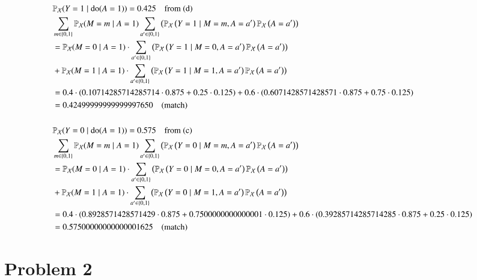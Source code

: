 \documentclass[10pt]{article}
\begin{document}
\begin{align*}
    &\mathbb{P}_{\mathcal{X}}(Y=1 \mid \operatorname{do}(A=1))=0.425 \quad \text{from (d)}\\
    &\sum_{m \in\{0,1\}} \mathbb{P}_{\mathcal{X}}(M=m \mid A=1) \sum_{a^{\prime} \in\{0,1\}}\left(\mathbb{P}_{\mathcal{X}}\left(Y=1 \mid M=m, A=a^{\prime}\right) \mathbb{P}_{\mathcal{X}}\left(A=a^{\prime}\right)\right)\\
    &= \mathbb{P}_{\mathcal{X}}(M=0 \mid A=1) \cdot \sum_{a^{\prime} \in\{0,1\}}\left(\mathbb{P}_{\mathcal{X}}\left(Y=1 \mid M=0, A=a^{\prime}\right) \mathbb{P}_{\mathcal{X}}\left(A=a^{\prime}\right)\right) \\ 
    &+ \mathbb{P}_{\mathcal{X}}(M=1 \mid A=1) \cdot \sum_{a^{\prime} \in\{0,1\}}\left(\mathbb{P}_{\mathcal{X}}\left(Y=1 \mid M=1, A=a^{\prime}\right) \mathbb{P}_{\mathcal{X}}\left(A=a^{\prime}\right)\right) \\
    &= 0.4 \cdot (0.10714285714285714\cdot 0.875 + 0.25 \cdot 0.125) + 0.6 \cdot(0.6071428571428571 \cdot 0.875 + 0.75\cdot 0.125)\\
    &= 0.42499999999999997650 \text{\quad (match)}\\\\
    &\mathbb{P}_{\mathcal{X}}(Y=0 \mid \operatorname{do}(A=1))=0.575 \quad \text{from (c)}\\
    &\sum_{m \in\{0,1\}} \mathbb{P}_{\mathcal{X}}(M=m \mid A=1) \sum_{a^{\prime} \in\{0,1\}}\left(\mathbb{P}_{\mathcal{X}}\left(Y=0 \mid M=m, A=a^{\prime}\right) \mathbb{P}_{\mathcal{X}}\left(A=a^{\prime}\right)\right)\\
    &= \mathbb{P}_{\mathcal{X}}(M=0 \mid A=1) \cdot \sum_{a^{\prime} \in\{0,1\}}\left(\mathbb{P}_{\mathcal{X}}\left(Y=0 \mid M=0, A=a^{\prime}\right) \mathbb{P}_{\mathcal{X}}\left(A=a^{\prime}\right)\right) \\ 
    &+ \mathbb{P}_{\mathcal{X}}(M=1 \mid A=1) \cdot \sum_{a^{\prime} \in\{0,1\}}\left(\mathbb{P}_{\mathcal{X}}\left(Y=0 \mid M=1, A=a^{\prime}\right) \mathbb{P}_{\mathcal{X}}\left(A=a^{\prime}\right)\right) \\
    &= 0.4 \cdot (0.8928571428571429\cdot 0.875 + 0.7500000000000001 \cdot 0.125) + 0.6 \cdot(0.39285714285714285 \cdot 0.875 + 0.25\cdot 0.125)\\
    &= 0.57500000000000001625 \text{\quad (match)}
\end{align*}

\section{Problem 2}
\end{document}
